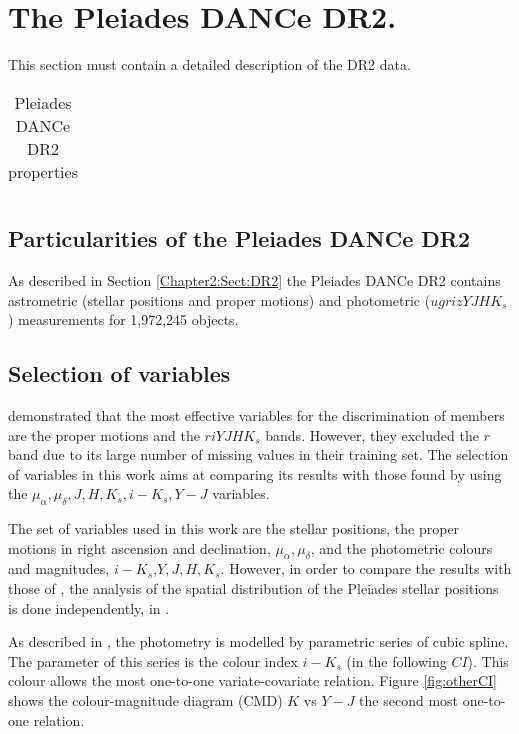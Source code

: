 \section{The Pleiades DANCe DR2.}
\label{sect:DR2}
This section must contain a detailed description of the DR2 data.

\begin{table}[htdp]
\caption{Pleiades DANCe DR2 properties}
\begin{center}
\begin{tabular}{|c|c|}

\end{tabular}
\end{center}
\label{tab:DR2properties}
\end{table}%
\subsection{Particularities of the Pleiades DANCe DR2}
As described in Section \ref{Chapter2:Sect:DR2} the Pleiades DANCe DR2 contains astrometric (stellar positions and proper motions) and photometric ($ugrizYJHK_s$) measurements for 1,972,245 objects. 



\subsection{Selection of variables}
\citet{Sarro2014} demonstrated that the most effective variables for the discrimination of members are the proper motions and the $riYJHK_s$ bands. However, they excluded the $r$ band due to its large number of missing values in their training set. The selection of variables in this work aims at comparing its results with those found by \citet{Bouy2015} using the $\mu_{\alpha},\mu_{\delta},J,H,K_s,i-K_s,Y-J$ variables. 

The set of variables used in this work are the stellar positions, the proper motions in right ascension and declination, $\mu_{\alpha},\mu_{\delta}$, and the photometric colours and magnitudes, $i-K_s$,$Y,J,H,K_s$. However, in order to compare the results with those of \citet{Bouy2015}, the analysis of the spatial distribution of the Pleiades stellar positions is done independently, in \citet{Olivares2017b}.

As described in \citet{Olivares2017}, the photometry is modelled by parametric series of cubic spline. The parameter of this series is the colour index $i-K_s$ (in the following $CI$). This colour allows the most one-to-one variate-covariate relation. Figure \ref{fig:otherCI} shows the colour-magnitude diagram (CMD) $K$ vs $Y-J$ the second most one-to-one relation.


